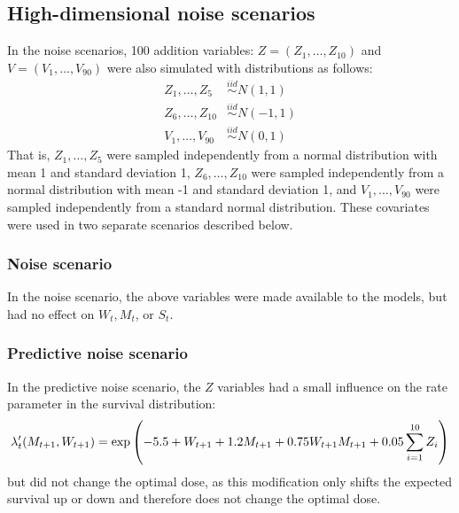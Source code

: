 \documentclass[12pt]{article}
\begin{document}

\subsection{High-dimensional noise scenarios} %
\label{sub:noise_variables}

In the noise scenarios, 100 addition variables: $Z = (Z_{1}, \ldots, Z_{10})$ and $V = (V_{1}, \ldots, V_{90})$ were also simulated with distributions as follows:
\begin{align}
  Z_{1}, \ldots, Z_{5} &\overset{iid}{\sim} N(1, 1) \\
  Z_{6}, \ldots, Z_{10} &\overset{iid}{\sim} N(-1, 1) \\
  V_{1}, \ldots, V_{90} &\overset{iid}{\sim} N(0, 1)
\end{align}
That is, $Z_{1}, \ldots, Z_{5}$ were sampled independently from a normal distribution with mean 1 and standard deviation 1, $Z_{6}, \ldots, Z_{10}$ were sampled independently from a normal distribution with mean -1 and standard deviation 1, and $V_{1}, \ldots, V_{90}$ were sampled independently from a standard normal distribution. These covariates were used in two separate scenarios described below.

\subsubsection{Noise scenario} %
\label{ssub:pure_noise}

In the noise scenario, the above variables were made available to the models, but had no effect on $W_{t}, M_{t}$, or $S_{t}$.


\subsubsection{Predictive noise scenario} %
\label{ssub:predictive_noise}
In the predictive noise scenario, the $Z$ variables had a small influence on the rate parameter in the survival distribution:
\begin{equation}
  \lambda'_{t}(M_{t+1}, W_{t+1}) = \exp\del{-5.5 + W_{t+1} + 1.2 M_{t+1} + 0.75 W_{t+1} M_{t+1} + 0.05 \sum_{i = 1}^{10} Z_{i}}
\end{equation}
but did not change the optimal dose, as this modification only shifts the expected survival up or down and therefore does not change the optimal dose.
\end{document}
